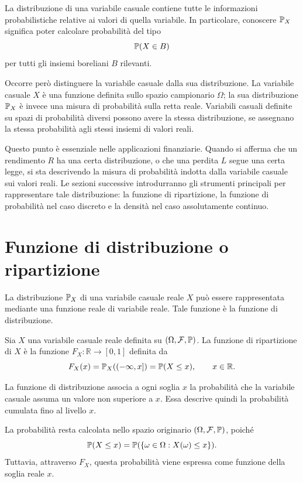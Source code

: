 La distribuzione di una variabile casuale contiene tutte le informazioni
probabilistiche relative ai valori di quella variabile. In particolare, conoscere
$\mathbb{P}_X$ significa poter calcolare probabilit\`{a} del tipo
\[
\mathbb{P}(X\in B)
\]
per tutti gli insiemi boreliani $B$ rilevanti.

Occorre per\`{o} distinguere la variabile casuale dalla sua distribuzione. La
variabile casuale $X$ \`{e} una funzione definita sullo spazio campionario
$\Omega$; la sua distribuzione $\mathbb{P}_X$ \`{e} invece una misura di
probabilit\`{a} sulla retta reale. Variabili casuali definite su spazi di
probabilit\`{a} diversi possono avere la stessa distribuzione, se assegnano la
stessa probabilit\`{a} agli stessi insiemi di valori reali.

Questo punto \`{e} essenziale nelle applicazioni finanziarie. Quando si afferma
che un rendimento $R$ ha una certa distribuzione, o che una perdita $L$ segue
una certa legge, si sta descrivendo la misura di probabilit\`{a} indotta dalla
variabile casuale sui valori reali. Le sezioni successive introdurranno gli
strumenti principali per rappresentare tale distribuzione: la funzione di
ripartizione, la funzione di probabilit\`{a} nel caso discreto e la densit\`{a} nel caso
assolutamente continuo.

\section{Funzione di distribuzione o ripartizione}
\label{sec:cap2-funzione-ripartizione}

La distribuzione $\mathbb{P}_X$ di una variabile casuale reale $X$ pu\`{o} essere
rappresentata mediante una funzione reale di variabile reale. Tale funzione \`{e}
la funzione di distribuzione.

\begin{definition}
Sia $X$ una variabile casuale reale definita su $(\Omega,\mathcal{F},\mathbb{P})$. La funzione
di ripartizione di $X$ \`{e} la funzione $F_X:\mathbb{R}\to[0,1]$ definita da
\[
F_X(x)
=
\mathbb{P}_X((-\infty,x])
=
\mathbb{P}(X\leq x),
\qquad x\in\mathbb{R}.
\]
\end{definition}

La funzione di distribuzione associa a ogni soglia $x$ la probabilit\`{a} che la
variabile casuale assuma un valore non superiore a $x$. Essa descrive quindi la
probabilit\`{a} cumulata fino al livello $x$.

La probabilit\`{a} resta calcolata nello spazio originario $(\Omega,\mathcal{F},\mathbb{P})$,
poich\'{e}
\[
\mathbb{P}(X\leq x)
=
\mathbb{P}(\{\omega\in\Omega:X(\omega)\leq x\}).
\]
Tuttavia, attraverso $F_X$, questa probabilit\`{a} viene espressa come funzione 
della soglia reale $x$.

